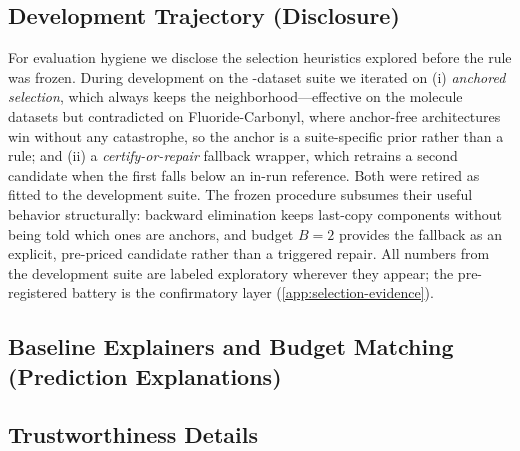 \subsection{Development Trajectory (Disclosure)}
\label{app:dev-trajectory}

For evaluation hygiene we disclose the selection heuristics explored
before the rule was frozen. During development on the
\unfrozen{\ResMarkerDatasets}-dataset suite we iterated on (i)
\emph{anchored selection}, which always keeps the
 neighborhood---effective on the molecule
datasets but contradicted on Fluoride-Carbonyl, where anchor-free
architectures win without any catastrophe, so the anchor is a
suite-specific prior rather than a rule; and (ii) a
\emph{certify-or-repair} fallback wrapper, which retrains a second
candidate when the first falls below an in-run reference. Both were
retired as fitted to the development suite. The frozen procedure
subsumes their useful behavior structurally: backward elimination
keeps last-copy components without being told which ones are anchors,
and budget $B=2$ provides the fallback as an explicit, pre-priced
candidate rather than a triggered repair. All numbers from the development suite
are labeled exploratory wherever they appear; the pre-registered
battery is the confirmatory layer (\cref{app:selection-evidence}).

\subsection{Baseline Explainers and Budget Matching (Prediction Explanations)}

\subsection{Trustworthiness Details}
\label{app:trust-details}

